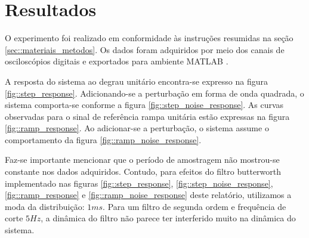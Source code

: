 \section{Resultados}









O experimento foi realizado em conformidade às instruções \cite{CDIN:Roteiro1} resumidas na seção \ref{sec::materiais_metodos}. Os dados foram adquiridos por meio dos canais de osciloscópios digitais e exportados para ambiente MATLAB \cite{Moler:1980:MATLAB}.

A resposta do sistema ao degrau unitário encontra-se expresso na figura \ref{fig::step_response}. Adicionando-se a perturbação em forma de onda quadrada, o sistema comporta-se conforme a figura \ref{fig::step_noise_response}. As curvas observadas para o sinal de referência rampa unitária estão expressas na figura \ref{fig::ramp_response}. Ao adicionar-se a perturbação, o sistema assume o comportamento da figura \ref{fig::ramp_noise_response}.

Faz-se importante mencionar que o período de amostragem não mostrou-se constante nos dados adquiridos. Contudo, para efeitos do filtro butterworth implementado nas figuras \ref{fig::step_response}, \ref{fig::step_noise_response}, \ref{fig::ramp_response} e \ref{fig::ramp_noise_response} deste relatório, utilizamos a moda da distribuição: $1ms$. Para um filtro de segunda ordem e frequência de corte $5Hz$, a dinâmica do filtro não parece ter interferido muito na dinâmica do sistema.